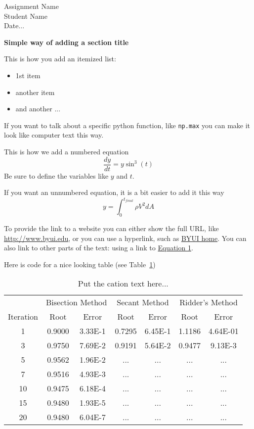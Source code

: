 \documentclass[11pt]{article}
\begin{document}
\begin{center}
  \large Assignment Name \\
Student Name \\
Date...
\end{center}

\textbf{Simple way of adding a section title}

This is how you add an itemized list:
\begin{itemize}
\item 1st item
\item another item
\item and another ...
\end{itemize}

If you want to talk about a specific python function, like \texttt{np.max} you can make it look like computer text this way.

This is how we add a numbered equation
\begin{equation}
\frac{dy}{dt} = y \sin^3(t)
\label{eq:name}
\end{equation}
Be sure to define the variables like $y$ and $t$.

If you want an unnumbered equation, it is a bit easier to add it this way
$$ y = \int_0^{t_{final}} \rho V^2 dA $$

To provide the link to a website you can either show the full URL, like \url{http://www.byui.edu}, or you can use a hyperlink, such as \href{http://www.byui.edu}{BYUI home}. You can also link to other parts of the text: using a link to \hyperref[eq:name]{Equation 1}.

Here is code for a nice looking table (see Table~\ref{tab:nice})

\begin{table}[htbp]
\caption{Put the cation text here...}
\label{tab:nice}
\begin{center}
\begin{tabular}{ccccccc} \toprule
~ & \multicolumn{2}{c}{Bisection Method} & \multicolumn{2}{c}{Secant Method} & \multicolumn{2}{c}{Ridder's Method}  \\ 
\cmidrule(lr){2-3} \cmidrule(lr){4-5} \cmidrule(lr){6-7}
 Iteration & Root & Error & Root & Error & Root & Error  \\ \midrule 
 1 	& 0.9000 & 3.33E-1 &  0.7295 & 6.45E-1 & 1.1186 & 4.64E-01 \\
 3 	& 0.9750 & 7.69E-2 &  0.9191 & 5.64E-2 & 0.9477 & 9.13E-3 \\
 5 	& 0.9562 & 1.96E-2 &...&...&...&... \\ 
 7 	& 0.9516 & 4.93E-3 &...&...&...&... \\
 10 & 0.9475 & 6.18E-4 &...&...&...&... \\
 15 & 0.9480 & 1.93E-5 &...&...&...&... \\
 20 & 0.9480 & 6.04E-7 &...&...&...&... \\ \bottomrule
\end{tabular}
\end{center}
\end{table}
\end{document}
